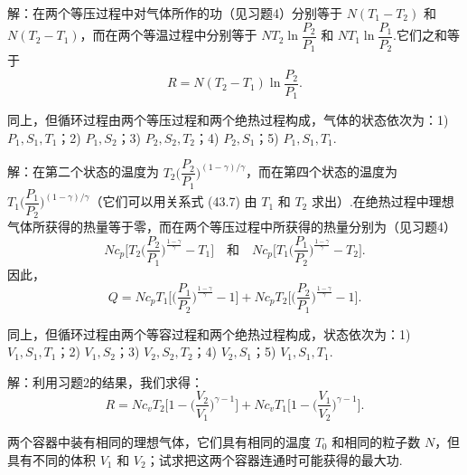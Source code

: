 \begin{xiti}
解：在两个等压过程中对气体所作的功（见习题4）分别等于 $N(T_1-T_2)$ 和 $N(T_2-T_1)$，而在两个等温过程中分别等于 $NT_2\ln\dfrac{P_2}{P_1}$ 和 $NT_1\ln\dfrac{P_1}{P_2}$.它们之和等于
\begin{equation*}
  R=N\left(T_2-T_1\right)\ln\frac{P_2}{P_1}.
\end{equation*}

\quad 同上，但循环过程由两个等压过程和两个绝热过程构成，气体的状态依次为：1) $P_1,S_1,T_1$；2) $P_1,S_2$；3) $P_2,S_2,T_2$；4) $P_2,S_1$；5) $P_1,S_1,T_1$.

解：在第二个状态的温度为 $T_2\Big(\dfrac{P_2}{P_1}\Big)^{(1-\gamma)/\gamma}$，而在第四个状态的温度为 $T_1\Big(\dfrac{P_1}{P_2}\Big)^{(1-\gamma)/\gamma}$（它们可以用关系式 (43.7) 由 $T_1$ 和 $T_2$ 求出）.在绝热过程中理想气体所获得的热量等于零，而在两个等压过程中所获得的热量分别为（见习题4）
\begin{equation*}
  Nc_p\Big[T_2\Big(\frac{P_2}{P_1}\Big)^{\frac{1-\gamma}{\gamma}}-T_1\Big]
  \quad\text{和}\quad
  Nc_p\Big[T_1\Big(\frac{P_1}{P_2}\Big)^{\frac{1-\gamma}{\gamma}}-T_2\Big].
\end{equation*}
因此，
\begin{equation*}
  Q=Nc_pT_1\Big[\Big(\frac{P_1}{P_2}\Big)^{\frac{1-\gamma}{\gamma}}-1\Big]
  +Nc_pT_2\Big[\Big(\frac{P_2}{P_1}\Big)^{\frac{1-\gamma}{\gamma}}-1\Big].
\end{equation*}

\quad 同上，但循环过程由两个等容过程和两个绝热过程构成，状态依次为：1) $V_1,S_1,T_1$；2) $V_1,S_2$；3) $V_2,S_2,T_2$；4) $V_2,S_1$；5) $V_1,S_1,T_1$.

解：利用习题2的结果，我们求得：
\begin{equation*}
  R=Nc_vT_2\Big[1-\Big(\frac{V_2}{V_1}\Big)^{\gamma-1}\Big]
  +Nc_vT_1\Big[1-\Big(\frac{V_1}{V_2}\Big)^{\gamma-1}\Big].
\end{equation*}

\quad 两个容器中装有相同的理想气体，它们具有相同的温度 $T_0$ 和相同的粒子数 $N$，但具有不同的体积 $V_1$ 和 $V_2$；试求把这两个容器连通时可能获得的最大功.


\end{xiti}
